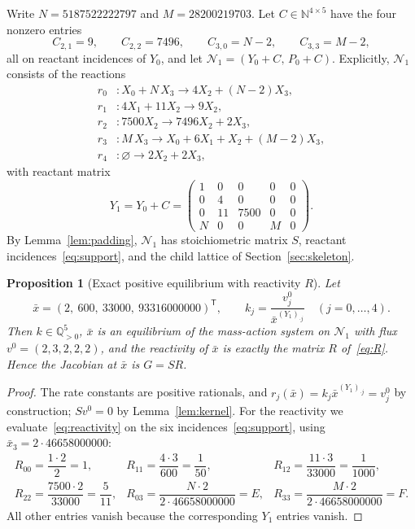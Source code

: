 \documentclass[11pt,a4paper]{article}
\theoremstyle{plain}
\newtheorem{proposition}[theorem]{Proposition}
\theoremstyle{definition}
\theoremstyle{remark}
\newcommand{\Q}{\mathbb{Q}}
\newcommand{\N}{\mathbb{N}}
\newcommand{\xbar}{\bar{x}}
\newcommand{\Nbig}{5187522222797}
\newcommand{\Mbig}{28200219703}
\newcommand{\Dbig}{46658000000}
\begin{document}
Write $N=\Nbig$ and $M=\Mbig$. Let $C\in\N^{4\times5}$ have the four nonzero entries
\begin{equation}\label{eq:C}
  C_{2,1}=9,\qquad C_{2,2}=7496,\qquad C_{3,0}=N-2,\qquad C_{3,3}=M-2,
\end{equation}
all on reactant incidences of $Y_0$, and let $\mathcal N_1=(Y_0+C,\,P_0+C)$. Explicitly, $\mathcal N_1$ consists of the reactions
\begin{equation}\label{eq:padded-reactions}
\begin{aligned}
  r_0&\colon X_0+N\,X_3\longrightarrow 4X_2+(N-2)X_3, \\
  r_1&\colon 4X_1+11X_2\longrightarrow 9X_2,\\
  r_2&\colon 7500X_2\longrightarrow 7496X_2+2X_3, \\
  r_3&\colon M\,X_3\longrightarrow X_0+6X_1+X_2+(M-2)X_3,\\
  r_4&\colon \varnothing\longrightarrow 2X_2+2X_3 ,
\end{aligned}
\end{equation}
with reactant matrix
\begin{equation}\label{eq:Y1}
  Y_1=Y_0+C=\begin{pmatrix}1&0&0&0&0\\0&4&0&0&0\\0&11&7500&0&0\\N&0&0&M&0\end{pmatrix}.
\end{equation}
By Lemma~\ref{lem:padding}, $\mathcal N_1$ has stoichiometric matrix $S$, reactant incidences~\eqref{eq:support}, and the child lattice of Section~\ref{sec:skeleton}.

\begin{proposition}[Exact positive equilibrium with reactivity $R$]\label{prop:padded-equilibrium}
Let
\begin{equation}\label{eq:xbar}
  \xbar=(2,\ 600,\ 33000,\ 93316000000)^{\mathsf T},\qquad k_j=\frac{v^0_j}{\xbar^{(Y_1)_{\cdot j}}}\quad(j=0,\dots,4).
\end{equation}
Then $k\in\Q^5_{>0}$, $\xbar$ is an equilibrium of the mass-action system on $\mathcal N_1$ with flux $v^0=(2,3,2,2,2)$, and the reactivity of $\xbar$ is exactly the matrix $R$ of~\eqref{eq:R}. Hence the Jacobian at $\xbar$ is $G=SR$.
\end{proposition}

\begin{proof}
The rate constants are positive rationals, and $r_j(\xbar)=k_j\xbar^{(Y_1)_{\cdot j}}=v^0_j$ by construction; $Sv^0=0$ by Lemma~\ref{lem:kernel}. For the reactivity we evaluate~\eqref{eq:reactivity} on the six incidences~\eqref{eq:support}, using $\xbar_3=2\cdot\Dbig$:
\[
\begin{array}{lll}
R_{00}=\dfrac{1\cdot2}{2}=1, &
R_{11}=\dfrac{4\cdot3}{600}=\dfrac1{50}, &
R_{12}=\dfrac{11\cdot3}{33000}=\dfrac1{1000},\\[8pt]
R_{22}=\dfrac{7500\cdot2}{33000}=\dfrac5{11}, &
R_{03}=\dfrac{N\cdot2}{2\cdot\Dbig}=E, &
R_{33}=\dfrac{M\cdot2}{2\cdot\Dbig}=F .
\end{array}
\]
All other entries vanish because the corresponding $Y_1$ entries vanish.
\end{proof}
\end{document}
